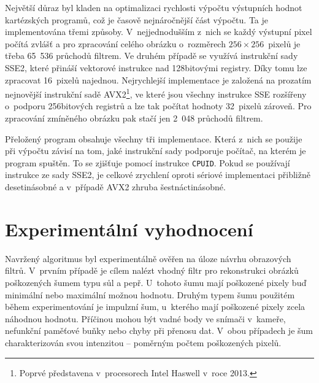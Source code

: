 \documentclass[fleqn,11pt]{ExcelAtFIT} %
\begin{document}
Největší důraz byl kladen na optimalizaci rychlosti výpočtu výstupních hodnot kartézských programů, což je časově nejnáročnější část výpočtu. Ta je implementována třemi způsoby. V~nejjednodušším z~nich se každý výstupní pixel počítá zvlášť a pro zpra\-co\-vání celého obrázku o~rozměrech $256\times256$~pixelů je třeba 65~536 průchodů filtrem. Ve druhém případě se využívá instrukční sady SSE2, které přináší vek\-to\-rové instrukce nad 128bitovými registry. Díky tomu lze zpracovat 16~pixelů najednou. Nejrychlejší im\-ple\-men\-tace je založená na prozatím nejnovější instrukční sadě AVX2\footnote{Poprvé představena v~procesorech Intel Haswell v~roce 2013.}, ve které jsou všechny instrukce SSE rozšířeny o~podporu 256bitových registrů a lze tak počítat hodnoty 32~pixelů zároveň. Pro zpracování zmíněného obrázku pak stačí jen 2~048 průchodů filtrem.

Přeložený program obsahuje všechny tři implementace. Která z~nich se použije při výpočtu závisí na tom, jaké instrukční sady podporuje počítač, na kterém je program spuštěn. To se zjišťuje pomocí instrukce \texttt{CPUID}. Pokud se používají instrukce ze sady SSE2, je celkové zrychlení oproti sériové implementaci při\-bližně dese\-ti\-ná\-sobné a v~případě AVX2 zhruba šest\-nác\-ti\-ná\-sobné.

\section{Experimentální vyhodnocení}
\label{sec:Experimental}

Navržený algoritmus byl experimentálně ověřen na úloze návrhu obrazových filtrů. V~prvním případě je cílem nalézt vhodný filtr pro rekonstrukci obrázků poškozených šumem typu sůl a pepř. U~tohoto šumu mají poškozené pixely buď minimální nebo maximální možnou hodnotu. Druhým typem šumu použitém během experimentování je impulzní šum, u~kterého mají poškozené pixely zcela náhodnou hodnotu. Příčinou mohou být vadné body ve snímači v~kameře, nefunkční paměťové buňky nebo chyby při přenosu dat. V~obou případech je šum charakterizován svou in\-ten\-zi\-tou -- poměrným počtem poškozených pixelů. %
\end{document}
